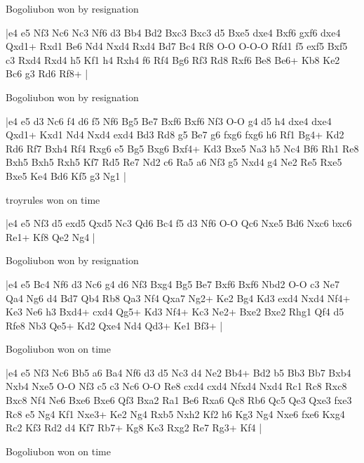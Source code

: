 \showboard

Bogoliubon won by resignation

\makegametitle
|e4 e5 Nf3 Nc6 Nc3 Nf6 d3 Bb4 Bd2 Bxc3 Bxc3 d5 Bxe5 dxe4 Bxf6 gxf6 dxe4 Qxd1+ Rxd1 Be6 Nd4 Nxd4 Rxd4 Bd7 Bc4 Rf8 O-O O-O-O Rfd1 f5 exf5 Bxf5 c3 Rxd4 Rxd4 h5 Kf1 h4 Rxh4 f6 Rf4 Bg6 Rf3 Rd8 Rxf6 Be8 Be6+ Kb8 Ke2 Bc6 g3 Rd6 Rf8+  |

\showboard

Bogoliubon won by resignation

\makegametitle
|e4 e5 d3 Nc6 f4 d6 f5 Nf6 Bg5 Be7 Bxf6 Bxf6 Nf3 O-O g4 d5 h4 dxe4 dxe4 Qxd1+ Kxd1 Nd4 Nxd4 exd4 Bd3 Rd8 g5 Be7 g6 fxg6 fxg6 h6 Rf1 Bg4+ Kd2 Rd6 Rf7 Bxh4 Rf4 Rxg6 e5 Bg5 Bxg6 Bxf4+ Kd3 Bxe5 Na3 h5 Nc4 Bf6 Rh1 Re8 Bxh5 Bxh5 Rxh5 Kf7 Rd5 Re7 Nd2 c6 Ra5 a6 Nf3 g5 Nxd4 g4 Ne2 Re5 Rxe5 Bxe5 Ke4 Bd6 Kf5 g3 Ng1  |

\showboard

troyrules won on time

\makegametitle
|e4 e5 Nf3 d5 exd5 Qxd5 Nc3 Qd6 Bc4 f5 d3 Nf6 O-O Qc6 Nxe5 Bd6 Nxc6 bxc6 Re1+ Kf8 Qe2 Ng4  |

\showboard

Bogoliubon won by resignation

\makegametitle
|e4 e5 Bc4 Nf6 d3 Nc6 g4 d6 Nf3 Bxg4 Bg5 Be7 Bxf6 Bxf6 Nbd2 O-O c3 Ne7 Qa4 Ng6 d4 Bd7 Qb4 Rb8 Qa3 Nf4 Qxa7 Ng2+ Ke2 Bg4 Kd3 exd4 Nxd4 Nf4+ Ke3 Ne6 h3 Bxd4+ cxd4 Qg5+ Kd3 Nf4+ Kc3 Ne2+ Bxe2 Bxe2 Rhg1 Qf4 d5 Rfe8 Nb3 Qe5+ Kd2 Qxe4 Nd4 Qd3+ Ke1 Bf3+  |

\showboard

Bogoliubon won on time

\makegametitle
|e4 e5 Nf3 Nc6 Bb5 a6 Ba4 Nf6 d3 d5 Nc3 d4 Ne2 Bb4+ Bd2 b5 Bb3 Bb7 Bxb4 Nxb4 Nxe5 O-O Nf3 c5 c3 Nc6 O-O Re8 cxd4 cxd4 Nfxd4 Nxd4 Rc1 Rc8 Rxc8 Bxc8 Nf4 Ne6 Bxe6 Bxe6 Qf3 Bxa2 Ra1 Be6 Rxa6 Qc8 Rb6 Qc5 Qe3 Qxe3 fxe3 Rc8 e5 Ng4 Kf1 Nxe3+ Ke2 Ng4 Rxb5 Nxh2 Kf2 h6 Kg3 Ng4 Nxe6 fxe6 Kxg4 Rc2 Kf3 Rd2 d4 Kf7 Rb7+ Kg8 Ke3 Rxg2 Re7 Rg3+ Kf4  |

\showboard

Bogoliubon won on time

